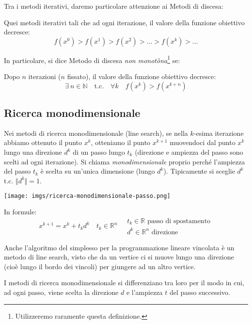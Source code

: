 Tra i metodi iterativi, daremo particolare attenzione ai Metodi di
discesa:
\begin{defn} Quei metodi iterativi tali che ad ogni
iterazione, il valore della funzione obiettivo decresce: $$ f(x^0) >
f(x^1) > f(x^2) > \ldots > f(x^k) > \ldots $$
\end{defn}

In particolare, si dice Metodo di discesa \emph{non
monotòna}\footnote{Utilizzeremo raramente questa definizione.} se:
\begin{defn} Dopo $n$ iterazioni ($n$
fissato), il valore della funzione obiettivo decresce:
$$ \exists ~ n \in \mathbb{N} \quad \text{t.c.} \quad \forall k \quad f(x^k) > f(x^{k+n}) $$
\end{defn}

\subsection{Ricerca monodimensionale} Nei metodi di ricerca
monodimensionale (line search), se nella $k$-esima iterazione abbiamo
ottenuto il punto $x^k$, otteniamo il punto $x^{k+1}$ muovendoci dal
punto $x^k$ lungo una direzione $d^k$ di un passo lungo $t_k$
(direzione e ampiezza del passo sono scelti ad ogni iterazione). Si
chiama \emph{monodimensionale} proprio perch\'e l'ampiezza del passo
$t_k$ \`e scelta su un'unica dimensione (lungo $d^k$). Tipicamente si
sceglie $d^k$ t.c. $\Vert d^k \Vert = 1$.

\centerline{\texttt{[image: imgs/ricerca-monodimensionale-passo.png]}}

In formule:
$$ x^{k+1} = x^{k} + t_k d^{k} \quad t_k \in \mathbb{R}^{n} \quad
  \begin{array}{l} t_k \in \mathbb{R}\text{ passo di spostamento} \\
d^{k} \in \mathbb{R}^n \text{ direzione}
  \end{array}
$$

\begin{notes} Anche l'algoritmo del simplesso per la programmazione
lineare vincolata \`e un metodo di line search, visto che da un vertice
ci si muove lungo una direzione (cio\`e lungo il bordo dei vincoli) per
giungere ad un altro vertice.
\end{notes}

I metodi di ricerca monodimensionale si differenziano tra loro
per il modo in cui, ad ogni passo, viene scelta la
direzione $d$ e l'ampiezza $t$ del passo successivo.


